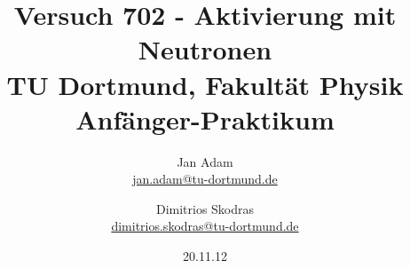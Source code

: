 

\usepackage{float}
\usepackage{caption}



\title{Versuch 702 - Aktivierung mit Neutronen\\				%
\large TU Dortmund, Fakultät Physik\\ 
\normalsize Anfänger-Praktikum}

\author{Jan Adam\\			%
{\small \href{jan.adam@tu-dortmund.de}{jan.adam@tu-dortmund.de}}	%
\and						%
Dimitrios Skodras\\			%
{\small \href{dimitrios.skodras@tu-dortmund.de}{dimitrios.skodras@tu-dortmund.de}}		%
}
\date{20.11.12}					%





\maketitle					%
\thispagestyle{empty} 				%



\tableofcontents


\newpage					%


